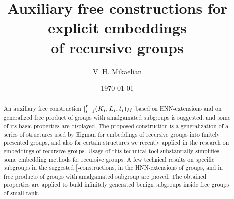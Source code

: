 \documentclass[12pt, a4paper]{amsart}
\newcommand{\1}{\{1\}}
\newcommand{\bigast}{\textrm{\footnotesize\ding{91}}}
\theoremstyle{plain}
\theoremstyle{definition}
\theoremstyle{remark}
\numberwithin{equation}{section}
\begin{document}


\title[Auxiliary free constructions]{Auxiliary free constructions for explicit embeddings\\ of recursive groups}

\author{V. H. Mikaelian
}


\begin{abstract}
An auxiliary free construction  $\textstyle
\bigast_{i=1}^{r}(K_i, L_i, t_i)_M$ based on HNN-exten\-sions and on generalized free product of groups with amalgamated subgroups is suggested, and some of its basic properties are displayed. The proposed construction is a generalization of a series of structures used by Higman for embeddings of recursive groups into finitely presented groups, and also for certain structures we recently applied in the research on embeddings of recursive groups. 
Usage of this technical tool substantially simplifies some embedding methods for recursive groups.
A few technical results on specific subgroups in the suggested $\bigast$-constructions, in the HNN-extensions of groups, and in free products of groups with amalgamated subgroup are proved. The obtained properties are applied to build infinitely generated benign subgroups inside free groups of small rank.
\end{abstract}

\date{\today}

\maketitle






\setcounter{tocdepth}{1}%

\let\oldtocsection=\tocsection
\let\oldtocsubsection=\tocsubsection
\let\oldtocsubsubsection=\tocsubsubsection
\renewcommand{\tocsection}[2]{\hspace{-12pt}\oldtocsection{#1}{#2}}
\renewcommand{\tocsubsection}[2]{\footnotesize \hspace{6pt} \oldtocsubsection{#1}{#2}}
\renewcommand{\tocsubsubsection}[2]{ \hspace{42pt}\oldtocsubsubsection{#1}{#2}}
\end{document}

